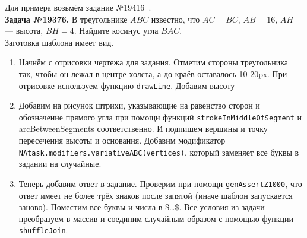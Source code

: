 Для примера возьмём задание №19416~\cite{egemath}.
\\
\textbf{Задача №19376.}
В треугольнике $ABC$ известно, что ${AC=BC}$, $AB=16$, $AH$ — высота, $BH=4$. Найдите косинус угла $BAC$.\\ 

Заготовка шаблона имеет вид.



\begin{enumerate}
    \item Начнём с отрисовки чертежа для задания. Отметим стороны треугольника так, чтобы он лежал в центре холста, а до краёв оставалось 10-20px. При отрисовке используем функцию \texttt{drawLine}. Добавим высоту 
     
    \item Добавим на рисунок штрихи, указывающие на равенство сторон и обозначение прямого угла при помощи функций \texttt{strokeInMiddleOfSegment} и arcBetweenSegments соответственно. И подпишем вершины и точку пересечения высоты и основания. Добавим модификатор \texttt{NAtask.modifiers.variativeABC(vertices)}, который заменяет все буквы в задании на случайные.
   

     
    \item Теперь добавим ответ в задание. Проверим при помощи \texttt{genAssertZ1000}, что ответ имеет не более трёх знаков после запятой (иначе шаблон запускается заново). Поместим все буквы и числа в \$\dots\$. Все условия из задачи преобразуем в массив и соединим случайным образом с помощью функции \texttt{shuffleJoin}.
     
\end{enumerate}
